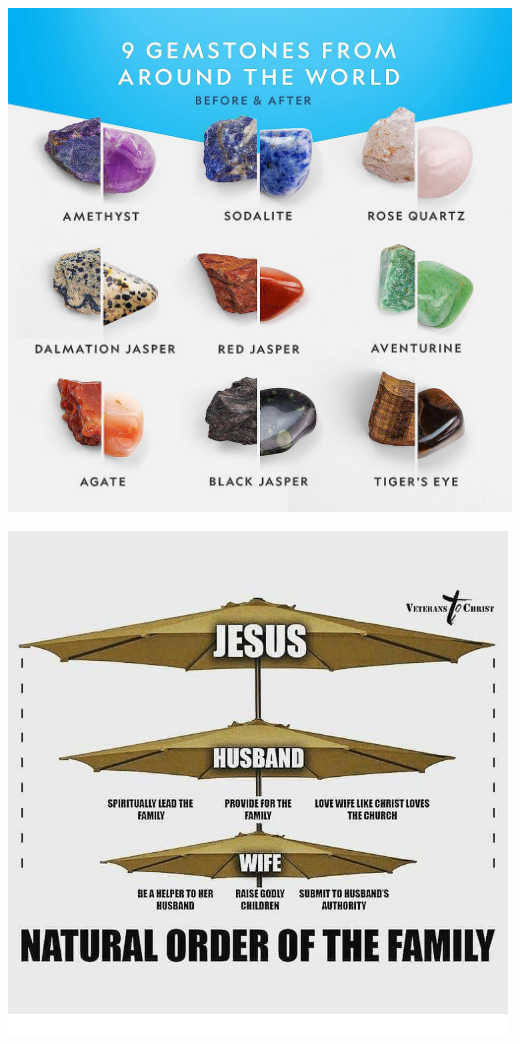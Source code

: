 \documentclass{beamer}
\begin{document}
\begin{frame}{}
	\centering
	\includegraphics[scale=.15]{images/gem-tumbler-03}
\end{frame}

\begin{frame}{}
	\centering
	\includegraphics[scale=.475]{images/natural-order-in-a-family}
\end{frame}
\end{document}
